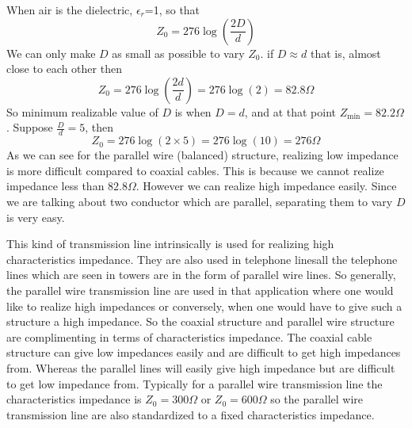 When air is the dielectric, $\epsilon_r$=1, so that
\begin{equation}
Z_0 = 276\log(\dfrac{2D}{d})
\label{eqn:parallelwiretxair}
\end{equation}
We can only make $D$ as small as possible to vary $Z_0 $. if $D\approx d$ that is, almost close to each other then 
\begin{dmath*}
Z_0 = 276\log(\dfrac{2d}{d})
=276\log(2)
=82.8\varOmega
\end{dmath*}
So minimum realizable value of $D$ is when $D = d$, and at that point $Z_\min=82.2\varOmega$. Suppose $\frac{D}{d}=5$, then
\begin{dmath*}
Z_0 =276\log(2\times5)
=276\log(10)
=276\varOmega
\end{dmath*}
As we can see for the parallel wire (balanced) structure, realizing low impedance is more difficult compared to coaxial cables. This is because we cannot realize impedance less than $82.8\varOmega$. However we can realize high impedance easily. Since we are talking about two conductor which are parallel, separating them to vary $D$ is very easy.

This kind of transmission line intrinsically is used for realizing high characteristics impedance. They are also used in telephone lines\textemdash\;all the telephone lines which are seen in towers are in the form of parallel wire lines. So generally, the parallel wire transmission line are used in that application where one would like to realize high impedances or conversely, when one would have to give such a structure a high impedance. So the coaxial structure and parallel wire structure are complimenting in terms of characteristics impedance. The coaxial cable structure can give low impedances easily and are difficult to get high impedances from. Whereas the parallel lines will easily give high impedance but are difficult to get low impedance from. Typically for a parallel wire transmission line the characteristics impedance is $Z_0 =300\varOmega$ or $Z_0 =600\varOmega$ so the parallel wire transmission line are also standardized to a fixed characteristics impedance.

